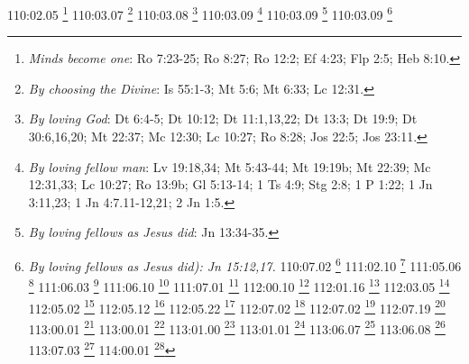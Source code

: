 {{{{{{{{{{110:02.05 \footnote{\textit{Minds become one}: Ro 7:23-25; Ro 8:27; Ro 12:2; Ef 4:23; Flp 2:5; Heb 8:10.}
110:03.07 \footnote{\textit{By choosing the Divine}: Is 55:1-3; Mt 5:6; Mt 6:33; Lc 12:31.}
110:03.08 \footnote{\textit{By loving God}: Dt 6:4-5; Dt 10:12; Dt 11:1,13,22; Dt 13:3; Dt 19:9; Dt 30:6,16,20; Mt 22:37; Mc 12:30; Lc 10:27; Ro 8:28; Jos 22:5; Jos 23:11.}
110:03.09 \footnote{\textit{By loving fellow man}: Lv 19:18,34; Mt 5:43-44; Mt 19:19b; Mt 22:39; Mc 12:31,33; Lc 10:27; Ro 13:9b; Gl 5:13-14; 1 Ts 4:9; Stg 2:8; 1 P 1:22; 1 Jn 3:11,23; 1 Jn 4:7.11-12,21; 2 Jn 1:5.}
110:03.09 \footnote{\textit{By loving fellows as Jesus did}: Jn 13:34-35.}
110:03.09 \footnote{\textit{By loving fellows as Jesus did): Jn 15:12,17.}
110:07.02 \footnote{\textit{In chariots of fire}: 2 Re 2:11; 2 Re 6:17.}
111:02.10 \footnote{\textit{Soul birth}: Jn 3:3-10; 1 P 1:22-23.}
111:05.06 \footnote{\textit{Not my will but God's will}: Sal 143:10; Eclo 15:11-20; Mt 6:10; Mt 7:21; Mt 12:50; Mt 26:39,42,44; Mc 3:35; Mc 14:36.39; Lc 8:21; Lc 11:2; Lc 22:42; Jn 4:34; Jn 5:30; Jn 6:38-40; Jn 7:16-17; Jn 9:31; Jn 14:21-24; Jn 15:10,14-16; Jn 17:4.}
111:06.03 \footnote{\textit{Good earth}: Gn 1:31; Sal 19:1.}
111:06.10 \footnote{\textit{Pride goes before a fall}: Pr 16:18.}
111:07.01 \footnote{\textit{Uncertainty with security}: Mc 9:24; Ro 4:20; Ro 11:20-33.}
112:00.10 \footnote{\textit{God is no respecter of persons}: 2 Cr 19:7; Job 34:19; Eclo 35:12; Hch 10:24; Ro 2:11; Gl 2:6; Gl 3:28; Ef 6:9; Col 3:11.}
112:01.16 \footnote{\textit{No man lives to himself}: Ro 14:7.}
112:03.05 \footnote{\textit{Dust to dust}: Gn 3:19; Job 17:14-16; Job 34:15; Ec 3:20.}
112:05.02 \footnote{\textit{We come from Eternal Father}: Jn 14:9-12,19-20.}
112:05.12 \footnote{\textit{Soul birth}: Jn 3:3.}
112:05.22 \footnote{\textit{Know and be known}: 1 Co 13:12.}
112:07.02 \footnote{\textit{Shores of a better world}: Heb 11:16.}
112:07.02 \footnote{\textit{When earthly race is rum}: 2 Ti 4:7.}
112:07.19 \footnote{\textit{Our frame is dust}: Gn 2:7; Gn 3:19; Sal 103:14; Ec 3:20.}
113:00.01 \footnote{\textit{Received by ministry of angels}: Hch 7:53.}
113:00.01 \footnote{\textit{Word spoken by angels}: Heb 2:2.}
113:01.00 \footnote{\textit{Guardian angels}: Bar 6:7.}
113:01.01 \footnote{\textit{Despise not little ones}: Mt 18:10.}
113:06.07 \footnote{\textit{Send angels to gather elect}: Mt 24:31; Mc 13:27.}
113:06.08 \footnote{\textit{Resurrection of the unjust}: Hch 24:15.}
113:07.03 \footnote{\textit{Created lower than angels}: Sal 8:4-5; Heb 2:6-7.}
114:00.01 \footnote{\textit{Most Highs rule}: Dn 4:17,25,32; Dn 5:21.}
}}}}}}}}}}}
